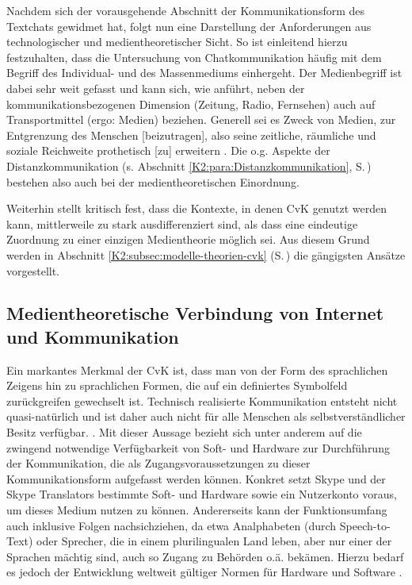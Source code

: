 Nachdem sich der vorausgehende Abschnitt der Kommunikationsform des Textchats gewidmet hat, folgt nun eine Darstellung der Anforderungen aus technologischer und medientheoretischer Sicht. So ist einleitend hierzu festzuhalten, dass die Untersuchung von Chatkommunikation häufig mit dem Begriff des Individual- und des Massenmediums einhergeht. Der Medienbegriff ist dabei sehr weit gefasst und kann sich, wie \citet[12]{beck_computervermittelte_2006} anführt, neben der kommunikationsbezogenen Dimension (Zeitung, Radio, Fernsehen) auch auf Transportmittel (ergo: Medien) beziehen. Generell sei es Zweck von Medien, zur \glqq Entgrenzung des Menschen [beizutragen], also seine zeitliche, räumliche und soziale Reichweite prothetisch [zu] erweitern\grqq{} \citep[12]{beck_computervermittelte_2006}. Die o.g. Aspekte der Distanzkommunikation (s. Abschnitt \ref{K2:para:Distanzkommunikation}, S.\,\pageref{K2:para:Distanzkommunikation}) bestehen also auch bei der medientheoretischen Einordnung.

Weiterhin stellt \citet[170]{schweiger_sozialkontakte_2019} kritisch fest, dass die Kontexte, in denen CvK genutzt werden kann, mittlerweile zu stark ausdifferenziert sind, als dass eine eindeutige Zuordnung zu einer einzigen Medientheorie möglich sei. Aus diesem Grund werden in Abschnitt \ref{K2:subsec:modelle-theorien-cvk} (S.\,\pageref{K2:subsec:modelle-theorien-cvk}) die gängigsten Ansätze vorgestellt.


%

\subsection{Medientheoretische Verbindung von Internet und Kommunikation}
\label{K2:subsec:medientheoretische-Internet-Kommunikation}

Ein markantes Merkmal der CvK ist, dass man von der \glqq Form des sprachlichen Zeigens\grqq{} \citep[1142]{brinker_voraussetzungen_2001} hin zu sprachlichen \glqq Formen, die auf ein definiertes Symbolfeld zurückgreifen\grqq{} \citep[1142]{brinker_voraussetzungen_2001} gewechselt ist. \glqq Technisch realisierte Kommunikation entsteht nicht quasi-natürlich und ist daher auch nicht für alle Menschen als selbstverständlicher Besitz verfügbar.\grqq{} \citep[1142]{brinker_voraussetzungen_2001}. Mit dieser Aussage bezieht sich \citeauthor{brinker_voraussetzungen_2001} unter anderem auf die zwingend notwendige Verfügbarkeit von Soft- und Hardware zur Durchführung der Kommunikation, die als Zugangsvoraussetzungen zu dieser Kommunikationsform aufgefasst werden können. Konkret setzt Skype und der Skype Translators bestimmte Soft- und Hardware sowie ein Nutzerkonto voraus, um dieses Medium nutzen zu können. Andererseits kann der Funktionsumfang auch inklusive Folgen nachsichziehen, da etwa Analphabeten (durch Speech-to-Text) oder Sprecher, die in einem plurilingualen Land leben, aber nur einer der Sprachen mächtig sind, auch so Zugang zu Behörden o.ä. bekämen. Hierzu bedarf es jedoch der Entwicklung \glqq weltweit gültiger Normen für Hardware und Software\grqq{} \citep[1147]{brinker_voraussetzungen_2001}.

